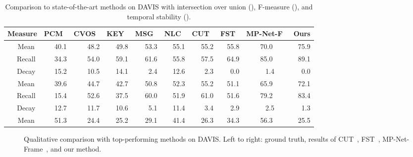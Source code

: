 \documentclass[10pt,twocolumn,letterpaper]{article}
\begin{document}
\begin{table*}[t]
\begin{center}
\begin{small}
\begin{tabular}{l | c | rrrrrrrcr}
\hline
\multicolumn{2}{c|}{Measure} & PCM~\cite{Bideau16} & CVOS~\cite{taylor2015causal} & KEY~\cite{lee2011key} & MSG~\cite{brox2010object} & NLC~\cite{Faktor14} & CUT~\cite{keuper2015motion} & FST~\cite{papazoglou2013fast} & MP-Net-F~\cite{tokmakov2016learning} & Ours \\
\hline
\multirow{3}{*}{} & Mean  & 40.1 & 48.2 & 49.8 & 53.3 & 55.1 & 55.2 & 55.8 & 70.0 & 75.9  \\
& Recall & 34.3 & 54.0 & 59.1 & 61.6  & 55.8 & 57.5 & 64.9 & 85.0 & 89.1  \\
& Decay & 15.2 & 10.5 & 14.1 & 2.4 & 12.6 & 2.3 & 0.0 & ~~1.4 & 0.0  \\
\hline
\multirow{3}{*}{} & Mean  & 39.6 & 44.7 & 42.7 & 50.8 & 52.3 & 55.2 & 51.1 & 65.9 & 72.1  \\
& Recall  & 15.4 & 52.6 & 37.5 & 60.0 & 51.9 & 61.0 & 51.6 & 79.2 & 83.4  \\
& Decay  & 12.7 & 11.7 & 10.6 & 5.1 & 11.4 & 3.4 & 2.9 & ~~2.5 & 1.3  \\
\hline
 & Mean  & 51.3 & 24.4 & 25.2 & 29.1 & 41.4 & 26.3 & 34.3 & 56.3 & 25.5  \\
\hline
\end{tabular}
\end{small}
\vspace{0.1cm}
\caption{Comparison to state-of-the-art methods on DAVIS with intersection over
union (), F-measure (), and temporal stability
().}
\label{tbl:soadavis}
\vspace{-0.4cm}
\end{center}
\end{table*}

\begin{figure*}[t]
\begin{center}
\vspace{0.1cm}
\vspace{0.1cm}
\vspace{0.1cm}
\end{center}
\vspace{-0.3cm}\caption{Qualitative comparison with top-performing methods on
DAVIS. Left to right: ground truth, results of CUT~\cite{keuper2015motion},
FST~\cite{papazoglou2013fast}, MP-Net-Frame~\cite{tokmakov2016learning}, and our method.}
\vspace{-0.4cm}
\label{fig:davis}
\end{figure*}
\end{document}
